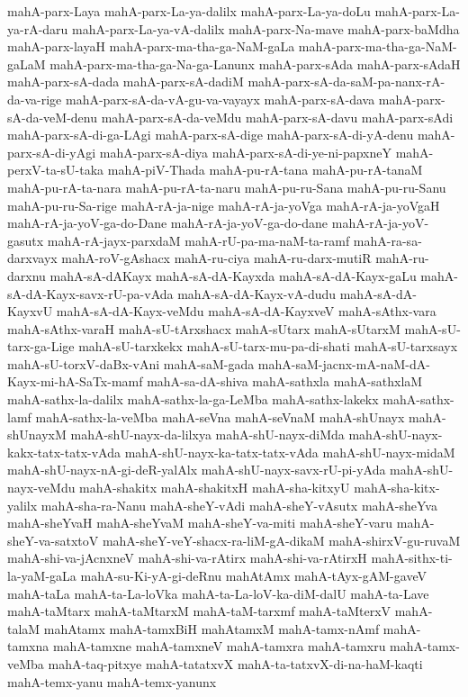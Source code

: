 {mahA-parx-Laya
mahA-parx-La-ya-dalilx
mahA-parx-La-ya-doLu
mahA-parx-La-ya-rA-daru
mahA-parx-La-ya-vA-dalilx
mahA-parx-Na-mave
mahA-parx-baMdha
mahA-parx-layaH
mahA-parx-ma-tha-ga-NaM-gaLa
mahA-parx-ma-tha-ga-NaM-gaLaM
mahA-parx-ma-tha-ga-Na-ga-Lanunx
mahA-parx-sAda
mahA-parx-sAdaH
mahA-parx-sA-dada
mahA-parx-sA-dadiM
mahA-parx-sA-da-saM-pa-nanx-rA-da-va-rige
mahA-parx-sA-da-vA-gu-va-vayayx
mahA-parx-sA-dava
mahA-parx-sA-da-veM-denu
mahA-parx-sA-da-veMdu
mahA-parx-sA-davu
mahA-parx-sAdi
mahA-parx-sA-di-ga-LAgi
mahA-parx-sA-dige
mahA-parx-sA-di-yA-denu
mahA-parx-sA-di-yAgi
mahA-parx-sA-diya
mahA-parx-sA-di-ye-ni-papxneY
mahA-perxV-ta-sU-taka
mahA-piV-Thada
mahA-pu-rA-tana
mahA-pu-rA-tanaM
mahA-pu-rA-ta-nara
mahA-pu-rA-ta-naru
mahA-pu-ru-Sana
mahA-pu-ru-Sanu
mahA-pu-ru-Sa-rige
mahA-rA-ja-nige
mahA-rA-ja-yoVga
mahA-rA-ja-yoVgaH
mahA-rA-ja-yoV-ga-do-Dane
mahA-rA-ja-yoV-ga-do-dane
mahA-rA-ja-yoV-gasutx
mahA-rA-jayx-parxdaM
mahA-rU-pa-ma-naM-ta-ramf
mahA-ra-sa-darxvayx
mahA-roV-gAshacx
mahA-ru-ciya
mahA-ru-darx-mutiR
mahA-ru-darxnu
mahA-sA-dAKayx
mahA-sA-dA-Kayxda
mahA-sA-dA-Kayx-gaLu
mahA-sA-dA-Kayx-savx-rU-pa-vAda
mahA-sA-dA-Kayx-vA-dudu
mahA-sA-dA-KayxvU
mahA-sA-dA-Kayx-veMdu
mahA-sA-dA-KayxveV
mahA-sAthx-vara
mahA-sAthx-varaH
mahA-sU-tArxshacx
mahA-sUtarx
mahA-sUtarxM
mahA-sU-tarx-ga-Lige
mahA-sU-tarxkekx
mahA-sU-tarx-mu-pa-di-shati
mahA-sU-tarxsayx
mahA-sU-torxV-daBx-vAni
mahA-saM-gada
mahA-saM-jacnx-mA-naM-dA-Kayx-mi-hA-SaTx-mamf
mahA-sa-dA-shiva
mahA-sathxla
mahA-sathxlaM
mahA-sathx-la-dalilx
mahA-sathx-la-ga-LeMba
mahA-sathx-lakekx
mahA-sathx-lamf
mahA-sathx-la-veMba
mahA-seVna
mahA-seVnaM
mahA-shUnayx
mahA-shUnayxM
mahA-shU-nayx-da-lilxya
mahA-shU-nayx-diMda
mahA-shU-nayx-kakx-tatx-tatx-vAda
mahA-shU-nayx-ka-tatx-tatx-vAda
mahA-shU-nayx-midaM
mahA-shU-nayx-nA-gi-deR-yalAlx
mahA-shU-nayx-savx-rU-pi-yAda
mahA-shU-nayx-veMdu
mahA-shakitx
mahA-shakitxH
mahA-sha-kitxyU
mahA-sha-kitx-yalilx
mahA-sha-ra-Nanu
mahA-sheY-vAdi
mahA-sheY-vAsutx
mahA-sheYva
mahA-sheYvaH
mahA-sheYvaM
mahA-sheY-va-miti
mahA-sheY-varu
mahA-sheY-va-satxtoV
mahA-sheY-veY-shacx-ra-liM-gA-dikaM
mahA-shirxV-gu-ruvaM
mahA-shi-va-jAcnxneV
mahA-shi-va-rAtirx
mahA-shi-va-rAtirxH
mahA-sithx-ti-la-yaM-gaLa
mahA-su-Ki-yA-gi-deRnu
mahAtAmx
mahA-tAyx-gAM-gaveV
mahA-taLa
mahA-ta-La-loVka
mahA-ta-La-loV-ka-diM-dalU
mahA-ta-Lave
mahA-taMtarx
mahA-taMtarxM
mahA-taM-tarxmf
mahA-taMterxV
mahA-talaM
mahAtamx
mahA-tamxBiH
mahAtamxM
mahA-tamx-nAmf
mahA-tamxna
mahA-tamxne
mahA-tamxneV
mahA-tamxra
mahA-tamxru
mahA-tamx-veMba
mahA-taq-pitxye
mahA-tatatxvX
mahA-ta-tatxvX-di-na-haM-kaqti
mahA-temx-yanu
mahA-temx-yanunx
}
